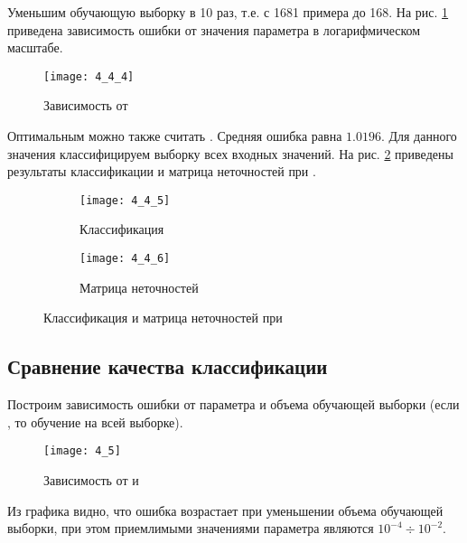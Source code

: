Уменьшим обучающую выборку в 10 раз, т.е. с 1681 примера до 168. На рис. \ref{fig:4_4_4} приведена зависимость ошибки  от значения параметра  в логарифмическом масштабе. 
\begin{figure}[H]
\begin{center}
	\texttt{[image: 4\_4\_4]}
	\caption{Зависимость  от }
	\label{fig:4_4_4}
\end{center}
\end{figure}
\vspace{-1cm}

Оптимальным можно также считать . Средняя ошибка равна $1.0196$. Для данного значения классифицируем выборку всех входных значений. На рис. \ref{fig:4_4_5} приведены результаты классификации и матрица неточностей при .
\begin{figure}[H]
\begin{center}
	\begin{subfigure}{0.49\textwidth}
		\texttt{[image: 4\_4\_5]}
		\caption{Классификация}
	\end{subfigure}
	\begin{subfigure}{0.49\textwidth}
		\texttt{[image: 4\_4\_6]}
		\caption{Матрица неточностей}
	\end{subfigure}
	\caption{Классификация и матрица неточностей при }
	\label{fig:4_4_5}
\end{center}
\end{figure}

\vspace{-1cm}
\subsection{Сравнение качества классификации}


Построим зависимость ошибки  от параметра  и объема обучающей выборки  (если , то обучение на всей выборке). 
\vspace{-0.5cm}
\begin{figure}[H]
\begin{center}
	\texttt{[image: 4\_5]}
	\caption{Зависимость  от  и }
	\label{fig:4_5}
\end{center}
\end{figure}
Из графика видно, что ошибка возрастает при уменьшении объема обучающей выборки, при этом приемлимыми значениями параметра  являются $10^{-4} \div 10^{-2}$.

